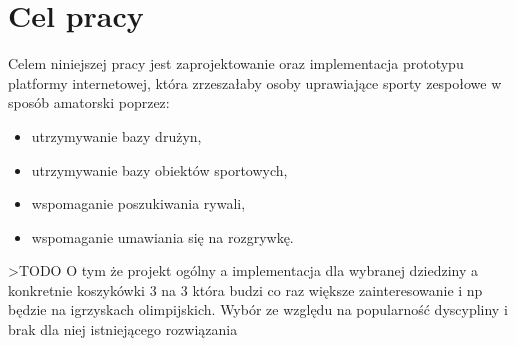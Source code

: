 \section{Cel pracy}

Celem niniejszej pracy jest zaprojektowanie oraz implementacja prototypu platformy internetowej, która zrzeszałaby osoby uprawiające sporty zespołowe w sposób amatorski poprzez:

\begin{itemize}
  \item utrzymywanie bazy drużyn,
  \item utrzymywanie bazy obiektów sportowych,
  \item wspomaganie poszukiwania rywali,
  \item wspomaganie umawiania się na rozgrywkę.
\end{itemize} 

>TODO O tym że projekt ogólny a implementacja dla wybranej dziedziny a konkretnie koszykówki 3 na 3 która budzi co raz większe zainteresowanie i np będzie na igrzyskach olimpijskich. Wybór ze względu na popularność dyscypliny i brak dla niej istniejącego rozwiązania
